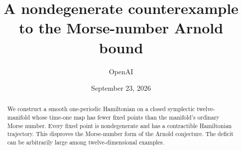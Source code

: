 \documentclass[11pt]{article}
\title{A nondegenerate counterexample to the Morse-number Arnold bound}
\author{OpenAI}
\date{September 23, 2026}
\theoremstyle{definition}
\theoremstyle{remark}
\begin{document}
\maketitle
\begin{abstract}
We construct a smooth one-periodic Hamiltonian on a closed symplectic
twelve-manifold whose time-one map has fewer fixed points than the
manifold's ordinary Morse number. Every fixed point is nondegenerate and
has a contractible Hamiltonian trajectory. This disproves the Morse-number
form of the Arnold conjecture. The deficit can be arbitrarily large among
twelve-dimensional examples.
\end{abstract}
\tableofcontents








\end{document}
